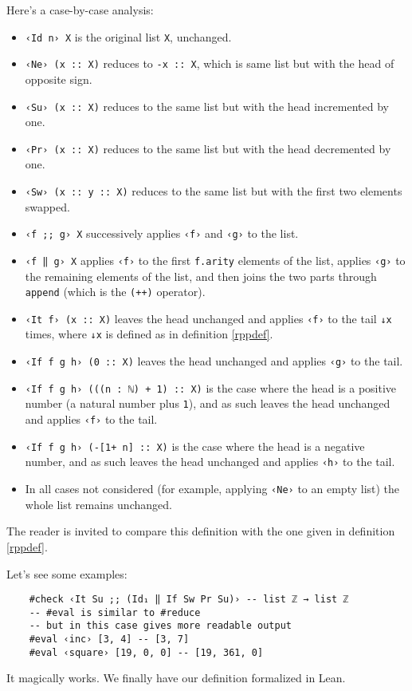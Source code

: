 \documentclass[runningheads]{llncs}
\begin{document}
Here's a case-by-case analysis:
\begin{itemize}
    \item \lstinline{‹Id n› X} is the original list \lstinline{X}, unchanged.
    \item \lstinline{‹Ne› (x :: X)} reduces to \lstinline{-x :: X}, which is same list but with the head of opposite sign.
    \item \lstinline{‹Su› (x :: X)} reduces to the same list but with the head incremented by one.
    \item \lstinline{‹Pr› (x :: X)} reduces to the same list but with the head decremented by one.
    \item \lstinline{‹Sw› (x :: y :: X)} reduces to the same list but with the first two elements swapped.
    \item \lstinline{‹f ;; g› X} successively applies \lstinline{‹f›} and \lstinline{‹g›} to the list.
    \item \lstinline{‹f ‖ g› X} applies \lstinline{‹f›} to the first \lstinline{f.arity} elements of the list,
    applies \lstinline{‹g›} to the remaining elements of the list,
    and then joins the two parts through \lstinline{append} (which is the \lstinline{(++)} operator).
    \item \lstinline{‹It f› (x :: X)} leaves the head unchanged and applies \lstinline{‹f›} to the tail \lstinline{↓x} times,
    where \lstinline{↓x} is defined as in definition \ref{rppdef}.
    \item \lstinline{‹If f g h› (0 :: X)} leaves the head unchanged and applies \lstinline{‹g›} to the tail.
    \item \lstinline{‹If f g h› (((n : ℕ) + 1) :: X)} is the case where the head is a positive number
    (a natural number plus \lstinline{1}),
    and as such leaves the head unchanged and applies \lstinline{‹f›} to the tail.
    \item \lstinline{‹If f g h› (-[1+ n] :: X)} is the case where the head is a negative number,
    and as such leaves the head unchanged and applies \lstinline{‹h›} to the tail.
    \item In all cases not considered (for example, applying \lstinline{‹Ne›} to an empty list) the whole list remains unchanged.
\end{itemize}

The reader is invited to compare this definition with the one given in definition \ref{rppdef}.

Let's see some examples:
\begin{lstlisting}
    #check ‹It Su ;; (Id₁ ‖ If Sw Pr Su)› -- list ℤ → list ℤ
    -- #eval is similar to #reduce
    -- but in this case gives more readable output
    #eval ‹inc› [3, 4] -- [3, 7]
    #eval ‹square› [19, 0, 0] -- [19, 361, 0]
\end{lstlisting}
It magically works. We finally have our definition formalized in Lean.
\end{document}
